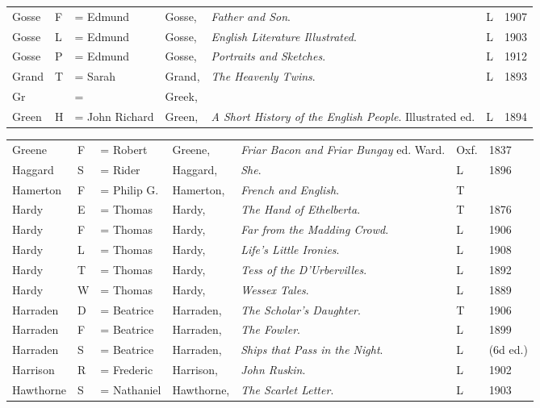\begin{sidewaystable}
\begin{tabular}{p{} p{} p{} p{} p{} p{} p{}}
Gosse & F & = Edmund & Gosse, & \textit{Father and Son}. & L & 1907 \\
Gosse & L & = Edmund & Gosse, & \textit{English Literature Illustrated}. & L & 1903 \\
Gosse & P & = Edmund & Gosse, & \textit{Portraits and Sketches}. & L & 1912 \\
Grand & T & = Sarah & Grand, & \textit{The Heavenly Twins}. & L & 1893 \\
Gr & & = & Greek, & & & \\
Green & H & = John Richard & Green, & \textit{A Short History of the English People}. Illustrated ed. & L & 1894 \\
\end{tabular}
\end{sidewaystable}

\begin{sidewaystable}
\centering\small
\begin{tabular}{p{} p{} p{} p{} p{} p{} p{}}
Greene & F & = Robert & Greene, & \textit{Friar Bacon and Friar Bungay} ed. Ward. & Oxf. & 1837 \\
Haggard & S & = Rider & Haggard, & \textit{She}. & L & 1896 \\
Hamerton & F & = Philip G. & Hamerton, & \textit{French and English}. & T & \\
Hardy & E & = Thomas & Hardy, & \textit{The Hand of Ethelberta}. & T & 1876 \\
Hardy & F & = Thomas & Hardy, & \textit{Far from the Madding Crowd}. & L & 1906 \\
Hardy & L & = Thomas & Hardy, & \textit{Life's Little Ironies}. & L & 1908 \\
Hardy & T & = Thomas & Hardy, & \textit{Tess of the D'Urbervilles}. & L & 1892 \\
Hardy & W & = Thomas & Hardy, & \textit{Wessex Tales}. & L & 1889 \\
Harraden & D & = Beatrice & Harraden, & \textit{The Scholar's Daughter}. & T & 1906 \\
Harraden& F & = Beatrice & Harraden, & \textit{The Fowler}. & L & 1899 \\
Harraden& S & = Beatrice & Harraden, & \textit{Ships that Pass in the Night}. & L & (6d ed.) \\
Harrison & R & = Frederic & Harrison, & \textit{John Ruskin}. & L & 1902 \\
Hawthorne & S & = Nathaniel & Hawthorne, & \textit{The Scarlet Letter}. & L & 1903 \\

\end{tabular}
\end{sidewaystable}

